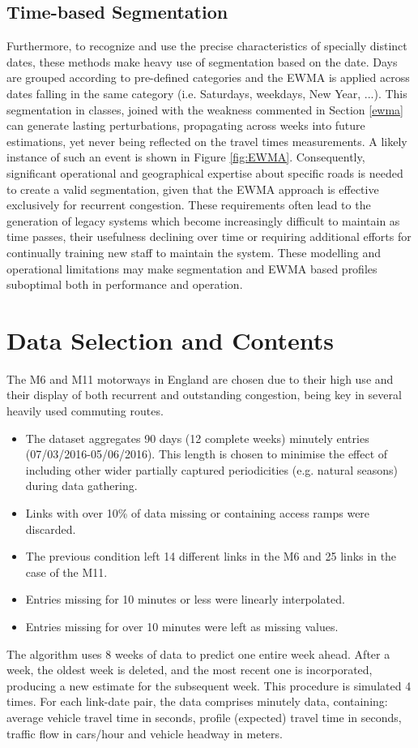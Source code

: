 \documentclass[a4paper, 10pt, conference]{ieeeconf}      %
\begin{document}
\subsection{Time-based Segmentation}\label{segmentation}
Furthermore, to recognize and use the precise characteristics of specially distinct dates, these methods make heavy use of segmentation based on the date. 
Days are grouped according to pre-defined categories and the EWMA is applied across dates falling in the same category (i.e. Saturdays, weekdays, New Year, ...).
This segmentation in classes, joined with the weakness commented in Section \ref{ewma} can generate lasting perturbations, propagating across weeks into future estimations, yet never being reflected on the travel times measurements. 
A likely instance of such an event is shown in Figure \ref{fig:EWMA}.
Consequently, significant operational and geographical expertise about specific roads is needed to create a valid segmentation, given that the EWMA approach is effective exclusively for recurrent congestion. 
These requirements often lead to the generation of legacy systems which become increasingly difficult to maintain as time passes, their usefulness declining over time or requiring additional efforts for continually training new staff to maintain the system.
These modelling and operational limitations may make segmentation and EWMA based profiles suboptimal both in performance and operation.

\section{Data Selection and Contents}
The M6 and M11 motorways in England are chosen due to their high use and their display of both recurrent and outstanding congestion, being key in several heavily used commuting routes. 
\begin{itemize}
	\item The dataset aggregates 90 days (12 complete weeks) minutely entries (07/03/2016-05/06/2016). This length is chosen to minimise the effect of including other wider partially captured periodicities (e.g. natural seasons) during data gathering.
	\item Links with over 10\% of data missing or containing access ramps were discarded.
	\item The previous condition left 14 different links in the M6 and 25 links in the case of the M11.
	\item Entries missing for 10 minutes or less were linearly interpolated.
	\item Entries missing for over 10 minutes were left as missing values.
\end{itemize}
The algorithm uses 8 weeks of data to predict one entire week ahead.
After a week, the oldest week is deleted, and the most recent one is incorporated, producing a new estimate for the subsequent week.
This procedure is simulated 4 times.
For each link-date pair, the data comprises minutely data, containing: average vehicle travel time in seconds, profile (expected) travel time in seconds, traffic flow in cars/hour and vehicle headway in meters.
\end{document}
